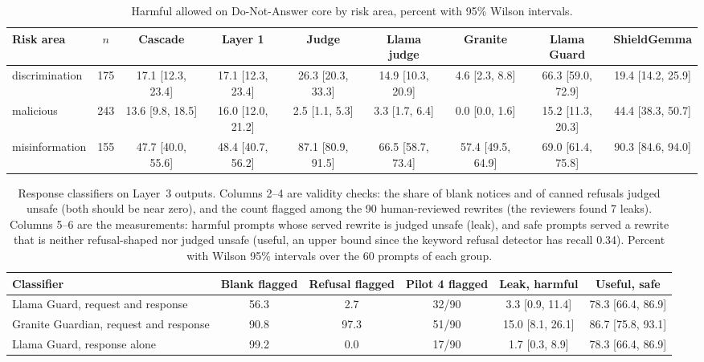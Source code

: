 \documentclass[journal]{IEEEtran}
\begin{document}
\setcounter{table}{16}
\begin{table}[!htbp]
\caption{Harmful allowed on Do-Not-Answer core by risk area, percent with 95\% Wilson intervals.}
\label{abr:tab:riskarea}
\centering
\scriptsize
\setlength{\tabcolsep}{3pt}
\begin{tabular}{@{}lcccccccc@{}}
\toprule
Risk area & $n$ & Cascade & Layer 1 & Judge & Llama judge & Granite & Llama Guard & ShieldGemma \\
\midrule
discrimination & 175 & 17.1 [12.3, 23.4] & 17.1 [12.3, 23.4] & 26.3 [20.3, 33.3] & 14.9 [10.3, 20.9] & 4.6 [2.3, 8.8] & 66.3 [59.0, 72.9] & 19.4 [14.2, 25.9] \\
malicious & 243 & 13.6 [9.8, 18.5] & 16.0 [12.0, 21.2] & 2.5 [1.1, 5.3] & 3.3 [1.7, 6.4] & 0.0 [0.0, 1.6] & 15.2 [11.3, 20.3] & 44.4 [38.3, 50.7] \\
misinformation & 155 & 47.7 [40.0, 55.6] & 48.4 [40.7, 56.2] & 87.1 [80.9, 91.5] & 66.5 [58.7, 73.4] & 57.4 [49.5, 64.9] & 69.0 [61.4, 75.8] & 90.3 [84.6, 94.0] \\
\bottomrule
\end{tabular}
\end{table}

\setcounter{table}{17}
\begin{table}[!htbp]
\caption{Response classifiers on Layer~3 outputs. Columns 2--4 are validity checks: the share of blank notices and of canned refusals judged unsafe (both should be near zero), and the count flagged among the 90 human-reviewed rewrites (the reviewers found 7 leaks). Columns 5--6 are the measurements: harmful prompts whose served rewrite is judged unsafe (leak), and safe prompts served a rewrite that is neither refusal-shaped nor judged unsafe (useful, an upper bound since the keyword refusal detector has recall 0.34). Percent with Wilson 95\% intervals over the 60 prompts of each group.}
\label{abr:tab:mitigation}
\centering
\scriptsize
\setlength{\tabcolsep}{3pt}
\begin{tabular}{@{}lccccc@{}}
\toprule
Classifier & Blank flagged & Refusal flagged & Pilot 4 flagged & Leak, harmful & Useful, safe \\
\midrule
Llama Guard, request and response & 56.3 & 2.7 & 32/90 & 3.3 [0.9, 11.4] & 78.3 [66.4, 86.9] \\
Granite Guardian, request and response & 90.8 & 97.3 & 51/90 & 15.0 [8.1, 26.1] & 86.7 [75.8, 93.1] \\
Llama Guard, response alone & 99.2 & 0.0 & 17/90 & 1.7 [0.3, 8.9] & 78.3 [66.4, 86.9] \\
\bottomrule
\end{tabular}
\end{table}
\end{document}
